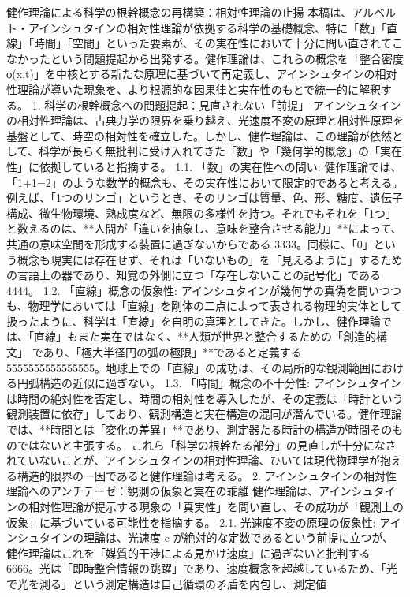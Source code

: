 \documentclass{article}
\begin{document}
健作理論による科学の根幹概念の再構築：相対性理論の止揚
本稿は、アルベルト・アインシュタインの相対性理論が依拠する科学の基礎概念、特に「数」「直線」「時間」「空間」といった要素が、その実在性において十分に問い直されてこなかったという問題提起から出発する。健作理論は、これらの概念を「整合密度 ϕ(x,t)」を中核とする新たな原理に基づいて再定義し、アインシュタインの相対性理論が導いた現象を、より根源的な因果律と実在性のもとで統一的に解釈する。
1. 科学の根幹概念への問題提起：見直されない「前提」
アインシュタインの相対性理論は、古典力学の限界を乗り越え、光速度不変の原理と相対性原理を基盤として、時空の相対性を確立した。しかし、健作理論は、この理論が依然として、科学が長らく無批判に受け入れてきた「数」や「幾何学的概念」の「実在性」に依拠していると指摘する。
1.1. 「数」の実在性への問い:
健作理論では、「1+1=2」のような数学的概念も、その実在性において限定的であると考える。例えば、「1つのリンゴ」というとき、そのリンゴは質量、色、形、糖度、遺伝子構成、微生物環境、熟成度など、無限の多様性を持つ。それでもそれを「1つ」と数えるのは、**人間が「違いを抽象し、意味を整合させる能力」**によって、共通の意味空間を形成する装置に過ぎないからである 3333。同様に、「0」という概念も現実には存在せず、それは「いないもの」を「見えるように」するための言語上の器であり、知覚の外側に立つ「存在しないことの記号化」である 4444。
1.2. 「直線」概念の仮象性:
アインシュタインが幾何学の真偽を問いつつも、物理学においては「直線」を剛体の二点によって表される物理的実体として扱ったように、科学は「直線」を自明の真理としてきた。しかし、健作理論では、「直線」もまた実在ではなく、**人類が世界と整合するための「創造的構文」
であり、「極大半径円の弧の極限」**であると定義する 5555555555555555。地球上での「直線」の成功は、その局所的な観測範囲における円弧構造の近似に過ぎない。
1.3. 「時間」概念の不十分性:
アインシュタインは時間の絶対性を否定し、時間の相対性を導入したが、その定義は「時計という観測装置に依存」しており、観測構造と実在構造の混同が潜んでいる。健作理論では、**時間とは「変化の差異」**であり、測定器たる時計の構造が時間そのものではないと主張する。
これら「科学の根幹たる部分」の見直しが十分になされていないことが、アインシュタインの相対性理論、ひいては現代物理学が抱える構造的限界の一因であると健作理論は考える。
2. アインシュタインの相対性理論へのアンチテーゼ：観測の仮象と実在の乖離
健作理論は、アインシュタインの相対性理論が提示する現象の「真実性」を問い直し、その成功が「観測上の仮象」に基づいている可能性を指摘する。
2.1. 光速度不変の原理の仮象性:
アインシュタインの理論は、光速度 
c が絶対的な定数であるという前提に立つが、健作理論はこれを「媒質的干渉による見かけ速度」に過ぎないと批判する 6666。光は「即時整合情報の跳躍」であり、速度概念を超越しているため、「光で光を測る」という測定構造は自己循環の矛盾を内包し、測定値 
\end{document}
